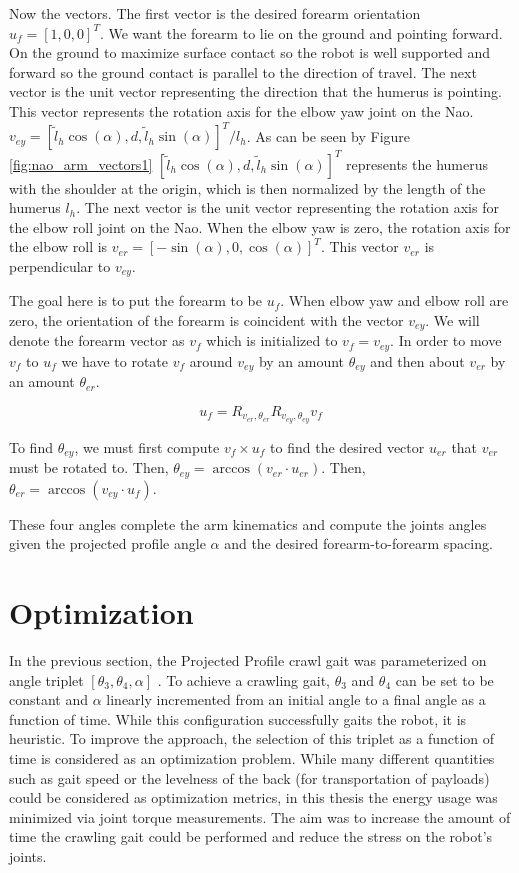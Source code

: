 Now the vectors.
The first vector is the desired forearm orientation $u_f = [1, 0, 0]^T$. We want the forearm to lie on the ground
and pointing forward. On the ground to maximize surface contact so the robot is well supported and forward so the
ground contact is parallel to the direction of travel.
The next vector is the unit vector representing the direction that the humerus is pointing.
This vector represents the rotation axis for the elbow yaw joint on the Nao.
$v_{ey} = [\tilde l_h \cos(\alpha), d, \tilde l_h \sin(\alpha)]^T / l_h$.
As can be seen by Figure \ref{fig:nao_arm_vectors1} $[\tilde l_h \cos(\alpha), d, \tilde l_h \sin(\alpha)]^T$ represents
the humerus with the shoulder at the origin, which is then normalized by the length of the humerus $l_h$.
The next vector is the unit vector representing the rotation axis for the elbow roll joint on the Nao.
When the elbow yaw is zero, the rotation axis for the elbow roll is $v_{er} = [-\sin(\alpha), 0, \cos(\alpha)]^T$.
This vector $v_{er}$ is perpendicular to $v_{ey}$.

The goal here is to put the forearm to be $u_f$. When elbow yaw and elbow roll are zero, the orientation of the
forearm is coincident with the vector $v_{ey}$. We will denote the forearm vector as $v_f$ which is initialized to
$v_f = v_{ey}$.
In order to move $v_f$ to $u_f$ we have to rotate $v_f$ around $v_{ey}$ by an amount $\theta_{ey}$ and then about
$v_{er}$ by an amount $\theta_{er}$.

\begin{equation}
	u_f = R_{v_{er}, \theta_{er}} R_{v_{ey}, \theta_{ey}} v_f
\end{equation}

To find $\theta_{ey}$, we must first compute $v_f \times u_f$ to find the desired vector $u_{er}$ that
$v_{er}$ must be rotated to. Then, $\theta_{ey} = \arccos(v_{er} \cdot u_{er})$.
Then, $\theta_{er} = \arccos(v_{ey} \cdot u_f)$.

These four angles complete the arm kinematics and compute the joints angles given the projected profile angle $\alpha$
and the desired forearm-to-forearm spacing.

\section{Optimization}

In the previous section, the Projected Profile crawl gait was parameterized on angle triplet 
$[ \theta_3, \theta_4, \alpha ]$ .
To achieve a crawling gait, $\theta_3$ and $\theta_4$ can be set to be constant and $\alpha$ linearly incremented
from an initial angle to a final angle as a function of time. While this configuration successfully gaits the robot,
it is heuristic. To improve the approach, the selection of this triplet as a function of time is considered as an
optimization problem. While many different quantities such as gait speed or the levelness of the back 
(for transportation of payloads) could be considered as optimization metrics, in this thesis the energy usage was 
minimized via joint torque measurements.
The aim was to increase the amount of time the crawling gait could be performed and reduce the stress on the robot's joints.

